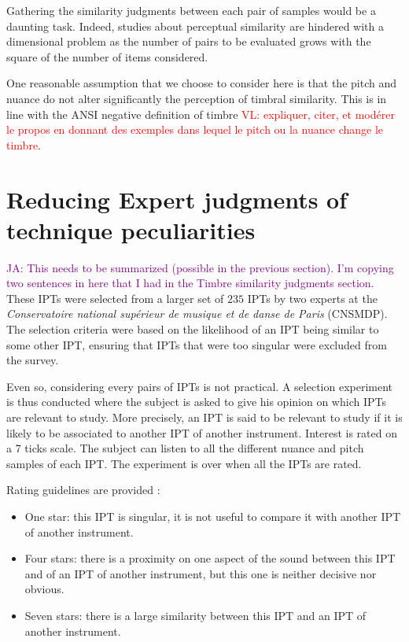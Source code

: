 \documentclass{bmcart}
\newcommand{\ipt}{IPT\xspace}
\newcommand{\ipts}{IPTs\xspace}
\newcommand{\vl}[1]{\textcolor{red}{VL: #1}}
\newcommand{\ja}[1]{\textcolor{purple}{JA: #1}}
\begin{document}
\begin{backmatter}
Gathering the similarity judgments between each pair of samples would be a daunting task. Indeed, studies about perceptual similarity are hindered with a dimensional problem as the number of pairs to be evaluated grows with the square of the number of items considered.

One reasonable assumption that we choose to consider here is that the pitch and nuance do not alter significantly the perception of timbral similarity. This is in line with the ANSI negative definition of timbre \vl{expliquer, citer, et modérer le propos en donnant des exemples dans lequel le pitch ou la nuance change le timbre}.


\section*{Reducing Expert judgments of technique peculiarities}

\ja{This needs to be summarized (possible in the previous section).
I'm copying two sentences in here that I had in the Timbre similarity judgments section.}%
These IPTs were selected from a larger set of $235$ IPTs by two experts at the \emph{Conservatoire national sup\'erieur de musique et de danse de Paris} (CNSMDP).
The selection criteria were based on the likelihood of an IPT being similar to some other IPT, ensuring that IPTs that were too singular were excluded from the survey.

Even so, considering every pairs of IPTs is not practical. A selection
experiment is thus conducted where the subject is asked to give his opinion on which
\ipts are relevant to study. More precisely, an \ipt is said to be relevant to study
if it is likely to be associated to another \ipt of another instrument.
Interest is rated on a 7 ticks scale. The subject can listen to all the different
nuance and pitch samples of each \ipt. The experiment is over when all the
\ipts are rated.

Rating guidelines are provided :
\begin{itemize}
  \item One star: this \ipt is singular, it is not useful to compare it with another \ipt of another instrument.
  \item Four stars: there is a proximity on one aspect of the sound between this
  \ipt and of an \ipt of another instrument,
  but this one is neither decisive nor obvious.
  \item Seven stars: there is a large similarity between this \ipt and an \ipt of another instrument.
\end{itemize}


\end{backmatter}
\end{document}
